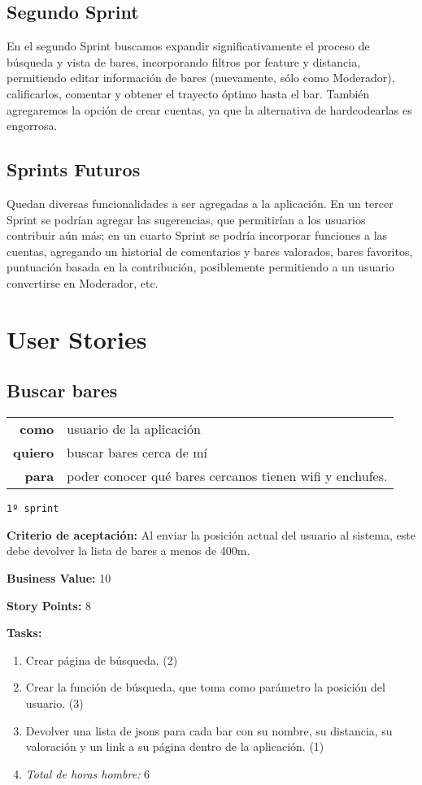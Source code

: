 \documentclass[hidelinks,a4paper,11pt, nofootinbib]{article}
\newcommand{\userstory}[3]{
\begin{tabular}{|r p{10cm}|}
  \hline
  \textbf{como} & #1 \\
  \textbf{quiero} & #2 \\
  \textbf{para} & #3 \\
  \hline
\end{tabular}

}
\newcommand{\critdeacep}[1]{\textbf{Criterio de aceptación:} #1

}
\newcommand{\busvalue}[1]{\textbf{Business Value:} #1

}
\newcommand{\storypoints}[1]{\textbf{Story Points:} #1

}
\newcommand{\primersprint}{\texttt{1º sprint}

}
\newcommand{\tasks}[1]{\textbf{Tasks:} 

#1}
\begin{document}
\subsection{Segundo Sprint}

\par En el segundo Sprint buscamos expandir significativamente el proceso de búsqueda y vista de bares, incorporando filtros por feature y distancia, permitiendo editar información de bares (nuevamente, sólo como Moderador), calificarlos, comentar y obtener el trayecto óptimo hasta el bar.
También agregaremos la opción de crear cuentas, ya que la alternativa de hardcodearlas es engorrosa.

\subsection{Sprints Futuros}

\par Quedan diversas funcionalidades a ser agregadas a la aplicación. 
En un tercer Sprint se podrían agregar las sugerencias, que permitirían a los usuarios contribuir aún más; en un cuarto Sprint se podría incorporar funciones a las cuentas, agregando un historial de comentarios y bares valorados, bares favoritos, puntuación basada en la contribución, posiblemente permitiendo a un usuario convertirse en Moderador, etc. 

\section{User Stories}

\subsection*{Buscar bares}
\userstory{usuario de la aplicación}{buscar bares cerca de mí}{poder conocer qué bares cercanos tienen wifi y enchufes.}
\primersprint
\critdeacep{Al enviar la posición actual del usuario al sistema, este debe devolver la lista de bares a menos de 400m.}
\busvalue{10}
\storypoints{8}
\tasks{
  \begin{enumerate}
    \item Crear página de búsqueda. (2)
    \item Crear la función de búsqueda, que toma como parámetro la posición del usuario. (3)
    \item Devolver una lista de jsons para cada bar con su nombre, su distancia, su valoración y un link a su página dentro de la aplicación. (1)
    \item[] \textit{Total de horas hombre:} 6
  \end{enumerate}
}
\end{document}
